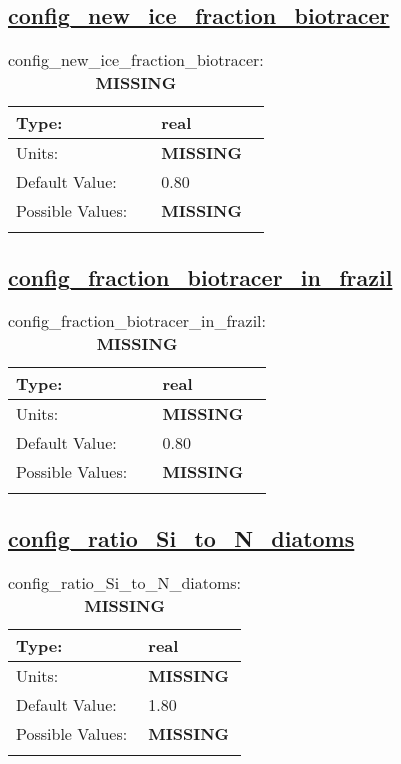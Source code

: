 \subsection[config\_new\_ice\_fraction\_biotracer]{\hyperref[sec:nm_tab_biogeochemistry]{config\_new\_ice\_fraction\_biotracer}}
\label{subsec:nm_sec_config_new_ice_fraction_biotracer}
\begin{center}
\begin{longtable}{| p{2.0in} || p{4.0in} |}
    \hline
    Type: & real \\
    \hline
    Units: & {\bf \color{red} MISSING} \\
    \hline
    Default Value: & 0.80 \\
    \hline
    Possible Values: & {\bf \color{red} MISSING} \\
    \hline
    \caption{config\_new\_ice\_fraction\_biotracer: {\bf \color{red} MISSING}}
\end{longtable}
\end{center}
\subsection[config\_fraction\_biotracer\_in\_frazil]{\hyperref[sec:nm_tab_biogeochemistry]{config\_fraction\_biotracer\_in\_frazil}}
\label{subsec:nm_sec_config_fraction_biotracer_in_frazil}
\begin{center}
\begin{longtable}{| p{2.0in} || p{4.0in} |}
    \hline
    Type: & real \\
    \hline
    Units: & {\bf \color{red} MISSING} \\
    \hline
    Default Value: & 0.80 \\
    \hline
    Possible Values: & {\bf \color{red} MISSING} \\
    \hline
    \caption{config\_fraction\_biotracer\_in\_frazil: {\bf \color{red} MISSING}}
\end{longtable}
\end{center}
\subsection[config\_ratio\_Si\_to\_N\_diatoms]{\hyperref[sec:nm_tab_biogeochemistry]{config\_ratio\_Si\_to\_N\_diatoms}}
\label{subsec:nm_sec_config_ratio_Si_to_N_diatoms}
\begin{center}
\begin{longtable}{| p{2.0in} || p{4.0in} |}
    \hline
    Type: & real \\
    \hline
    Units: & {\bf \color{red} MISSING} \\
    \hline
    Default Value: & 1.80 \\
    \hline
    Possible Values: & {\bf \color{red} MISSING} \\
    \hline
    \caption{config\_ratio\_Si\_to\_N\_diatoms: {\bf \color{red} MISSING}}
\end{longtable}
\end{center}
